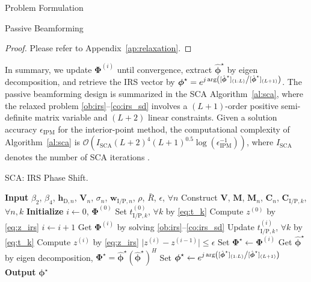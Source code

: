 \documentclass[journal]{IEEEtran}
\begin{document}
\begin{section}{Problem Formulation}
\begin{subsection}{Passive Beamforming}
			\begin{proof}\label{pf:relaxation}
				Please refer to Appendix~\ref{ap:relaxation}.
			\end{proof}

			In summary, we update $\boldsymbol{\Phi}^{(i)}$ until convergence, extract $\hat{\boldsymbol{\phi}}^\star$ by eigen decomposition, and retrieve the	IRS vector by $\boldsymbol{\phi}^{\star}=e^{j \arg\left([\hat{\boldsymbol{\phi}}^\star]_{(1:L)} \middle/ [\hat{\boldsymbol{\phi}}^\star]_{(L+1)}\right)}$. The passive beamforming design is summarized in the SCA Algorithm~\ref{al:sca}, where the relaxed problem \eqref{ob:irs}--\eqref{co:irs_sd} involves a $(L+1)$-order positive semi-definite matrix variable and $(L+2)$ linear constraints. Given a solution accuracy $\epsilon_{\mathrm{IPM}}$ for the interior-point method, the computational complexity of Algorithm~\ref{al:sca} is $\mathcal{O}\left(I_{\mathrm{SCA}}(L+2)^4 (L+1)^{0.5} \log(\epsilon_{\mathrm{IPM}}^{-1})\right)$, where $I_{\mathrm{SCA}}$ denotes the number of SCA iterations \cite{Luo2010}.

			\begin{algorithm}[!t]
				\caption{SCA: IRS Phase Shift.}
				\label{al:sca}
				\begin{algorithmic}[1]
					\State \textbf{Input} $\beta_2$, $\beta_4$, $\boldsymbol{h}_{\mathrm{D},n}$, $\boldsymbol{V}_{n}$, $\sigma_n$, $\boldsymbol{w}_{\mathrm{I/P},n}$, $\rho$, $\bar{R}$, $\epsilon$, $\forall n$
					\State Construct $\boldsymbol{V}$, $\boldsymbol{M}$, $\boldsymbol{M}_n$, $\boldsymbol{C}_{n}$, $\boldsymbol{C}_{\mathrm{I/P},k}$, $\forall n,k$
					\State \textbf{Initialize} $i \gets 0$, $\boldsymbol{\Phi}^{(0)}$
					\State Set $t_{\mathrm{I/P},k}^{(0)}$, $\forall k$ by \eqref{eq:t_k}
					\State Compute $z^{(0)}$ by \eqref{eq:z_irs}
					\Repeat
						\State $i \gets i + 1$
						\State Get $\boldsymbol{\Phi}^{(i)}$ by solving \eqref{ob:irs}--\eqref{co:irs_sd}
						\State Update $t_{\mathrm{I/P},k}^{(i)}$, $\forall k$ by \eqref{eq:t_k}
						\State Compute $z^{(i)}$ by \eqref{eq:z_irs}
					\Until $\lvert z^{(i)}-z^{(i-1)} \rvert \le \epsilon$
					\State Set $\boldsymbol{\Phi}^{\star} \gets \boldsymbol{\Phi}^{(i)}$
					\State Get $\hat{\boldsymbol{\phi}}^\star$ by eigen decomposition, $\boldsymbol{\Phi}^{\star}=\hat{\boldsymbol{\phi}}^\star(\hat{\boldsymbol{\phi}}^\star)^H$
					\State Set $\boldsymbol{\phi}^{\star} \gets e^{j \arg\left([\hat{\boldsymbol{\phi}}^\star]_{(1:L)} \middle/ [\hat{\boldsymbol{\phi}}^\star]_{(L+1)}\right)}$
					\State \textbf{Output} $\boldsymbol{\phi}^{\star}$
				\end{algorithmic}
			\end{algorithm}


\end{subsection}
\end{section}
\end{document}
